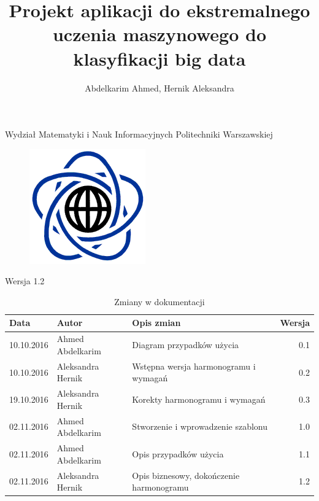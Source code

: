 \documentclass{article}
\title{Projekt aplikacji do ekstremalnego uczenia maszynowego do klasyfikacji big data}
\author{Abdelkarim Ahmed, Hernik Aleksandra}
\begin{document}
Wydział Matematyki i Nauk Informacyjnych Politechniki Warszawskiej
\begin{figure}[H]
\begin{center}
\includegraphics[scale=0.5]{MiNI.png}
\end{center}
\end{figure}
\vspace*{\fill}
\begin{center}
\begin{minipage}{.9\textwidth}
\maketitle
\begin{center}Wersja 1.2\end{center}
\end{minipage}
\end{center}
\vfill %
\clearpage
\noindent
\begin{table}[H]
\caption{Zmiany w dokumentacji}
\hspace*{-1cm}
\begin{tabular}{|l|l|l|r|}
\hline
\textbf{Data} & \textbf{Autor} & \textbf{Opis zmian} & \textbf{Wersja} \\
\hline
10.10.2016 & Ahmed Abdelkarim & Diagram przypadków użycia & 0.1 \\
10.10.2016 & Aleksandra Hernik & Wstępna wersja harmonogramu i wymagań & 0.2 \\
19.10.2016 & Aleksandra Hernik & Korekty harmonogramu i wymagań & 0.3 \\
02.11.2016 & Ahmed Abdelkarim & Stworzenie i wprowadzenie szablonu & 1.0 \\
02.11.2016 & Ahmed Abdelkarim & Opis przypadków użycia & 1.1 \\
02.11.2016 & Aleksandra Hernik & Opis biznesowy, dokończenie harmonogramu & 1.2 \\
\hline
\end{tabular}
\end{table}
\tableofcontents
\clearpage
\end{document}
